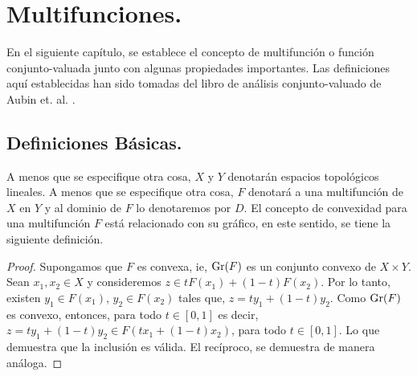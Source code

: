 \chapter{Multifunciones.}
\label{ChapMultifunciones}
\setcounter{theorem}{0}
En el siguiente capítulo, se establece el concepto
de multifunción o función conjunto-valuada junto con
algunas propiedades importantes. Las definiciones aquí establecidas
han sido tomadas del libro de análisis conjunto-valuado 
de Aubin et. al. \cite{AubPieFra09}.

\section{Definiciones Básicas.}
A menos que se especifique otra cosa, $X$ y $Y$ denotarán
espacios topológicos lineales.
A menos que se especifique otra cosa,
$F$ denotará a una multifunción de $X$ en $Y$ y al dominio
de $F$ lo denotaremos por $D$.
El concepto de convexidad para una multifunción $F$
está relacionado con su gráfico, en este sentido, se tiene
la siguiente definición.
\begin{proof}
Supongamos que $F$ es convexa, ie, $\mathop{\hbox{\rm Gr}}\nolimits(F)$ es un conjunto convexo de 
$X\times Y.$ Sean $x_1,x_2\in X$ y consideremos $z\in tF(x_1) + (1-t)F(x_2)$.
Por lo tanto, existen $y_1\in F(x_1)$, $y_2\in F(x_2)$ tales que, 
$
z=ty_1+(1-t)y_2.
$
Como $\mathop{\hbox{\rm Gr}}\nolimits(F)$ es convexo, entonces, para todo $t\in[0,1]$
es decir,
$z=ty_1+(1-t)y_2\in F(tx_1+(1-t)x_2)$, para todo $t\in[0,1]$. Lo que
demuestra que la inclusión  es válida. El recíproco, se demuestra
de manera análoga.
\end{proof}

